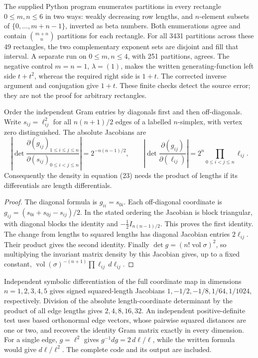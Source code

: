\begin{example}\oursComputed
The supplied Python program enumerates partitions in every rectangle
\(0\leq m,n\leq6\) in two ways: weakly decreasing row lengths, and
\(n\)-element subsets of \(\{0,\ldots,m+n-1\}\), inverted as beta numbers.
Both enumerations agree and contain \(\binom{m+n}{n}\) partitions for each
rectangle. For all 3431 partitions across these 49 rectangles, the two
complementary exponent sets are disjoint and fill that interval. A separate
run on \(0\leq m,n\leq4\), with 251 partitions, agrees. The negative control
\(m=n=1\), \(\lambda=(1)\), makes the written generating-function left side
\(t+t^2\), whereas the required right side is \(1+t\). The corrected inverse
argument and conjugation give \(1+t\). These finite checks detect the source
error; they are not the proof for arbitrary rectangles.
\end{example}

\begin{proposition}\ours
Order the independent Gram entries by diagonals first and then off-diagonals.
Write \(s_{ij}=\ell_{ij}^2\) for all \(n(n+1)/2\) edges of a labelled
\(n\)-simplex, with vertex zero distinguished. The absolute Jacobians are
\[
 \left|\det\frac{\partial(g_{ij})_{1\leq i\leq j\leq n}}
                         {\partial(s_{ij})_{0\leq i<j\leq n}}\right|
 =2^{-n(n-1)/2},
 \qquad
 \left|\det\frac{\partial(g_{ij})}{\partial(\ell_{ij})}\right|
 =2^n\prod_{0\leq i<j\leq n}\ell_{ij}.
\]
Consequently the density in equation (23) needs the product of lengths if
its differentials are length differentials.
\end{proposition}
\begin{proof}
The diagonal formula is \(g_{ii}=s_{0i}\). Each off-diagonal coordinate is
\(g_{ij}=(s_{0i}+s_{0j}-s_{ij})/2\). In the stated ordering the Jacobian is
block triangular, with diagonal blocks the identity and
\(-\tfrac12 I_{n(n-1)/2}\). This proves the first identity. The change from
lengths to squared lengths has diagonal Jacobian entries \(2\ell_{ij}\).
Their product gives the second identity. Finally
\(\det g=(n!\operatorname{vol}\sigma)^2\), so multiplying the invariant
matrix density by this Jacobian gives, up to a fixed constant,
\(\operatorname{vol}(\sigma)^{-(n+1)}\prod\ell_{ij}\,d\ell_{ij}\).
\end{proof}

\begin{example}\oursComputed
Independent symbolic differentiation of the full coordinate map in dimensions
\(n=1,2,3,4,5\) gives signed squared-length Jacobians
\(1,-1/2,-1/8,1/64,1/1024\), respectively. Division of the absolute
length-coordinate determinant by the product of all edge lengths gives
\(2,4,8,16,32\). An independent positive-definite test uses based orthonormal
edge vectors, whose pairwise squared distances are one or two, and recovers
the identity Gram matrix exactly in every dimension. For a single edge,
\(g=\ell^2\) gives \(g^{-1}dg=2\,d\ell/\ell\), while the written formula
would give \(d\ell/\ell^2\). The complete code and its output are included.
\end{example}


